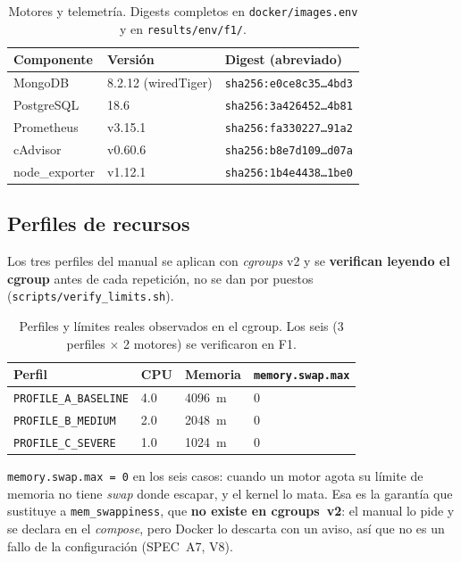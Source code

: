 \begin{table}[htbp]
  \centering
  \caption{Motores y telemetría. Digests completos en \texttt{docker/images.env} y
           en \texttt{results/env/f1/}.}
  \label{tab:imagenes}
  \small
  \begin{tabularx}{\linewidth}{llX}
    \toprule
    Componente & Versión & Digest (abreviado) \\
    \midrule
    MongoDB & 8.2.12 (wiredTiger) & \texttt{sha256:e0ce8c35\ldots{}4bd3} \\
    PostgreSQL & 18.6 & \texttt{sha256:3a426452\ldots{}4b81} \\
    Prometheus & v3.15.1 & \texttt{sha256:fa330227\ldots{}91a2} \\
    cAdvisor & v0.60.6 & \texttt{sha256:b8e7d109\ldots{}d07a} \\
    node\_exporter & v1.12.1 & \texttt{sha256:1b4e4438\ldots{}1be0} \\
    \bottomrule
  \end{tabularx}
\end{table}

\subsection{Perfiles de recursos}

Los tres perfiles del manual se aplican con \emph{cgroups} v2 y se
\textbf{verifican leyendo el cgroup} antes de cada repetición, no se dan por
puestos (\texttt{scripts/verify\_limits.sh}).

\begin{table}[htbp]
  \centering
  \caption{Perfiles y límites reales observados en el cgroup. Los seis
           (3 perfiles $\times$ 2 motores) se verificaron en F1.}
  \label{tab:perfiles}
  \small
  \begin{tabular}{llll}
    \toprule
    Perfil & CPU & Memoria & \texttt{memory.swap.max} \\
    \midrule
    \texttt{PROFILE\_A\_BASELINE} & 4.0 & 4096~m & 0 \\
    \texttt{PROFILE\_B\_MEDIUM}   & 2.0 & 2048~m & 0 \\
    \texttt{PROFILE\_C\_SEVERE}   & 1.0 & 1024~m & 0 \\
    \bottomrule
  \end{tabular}
\end{table}

\texttt{memory.swap.max = 0} en los seis casos: cuando un motor agota su límite
de memoria no tiene \emph{swap} donde escapar, y el kernel lo mata. Esa es la
garantía que sustituye a \texttt{mem\_swappiness}, que \textbf{no existe en
cgroups~v2}: el manual lo pide y se declara en el \emph{compose}, pero Docker lo
descarta con un aviso, así que no es un fallo de la configuración (SPEC~A7, V8).

